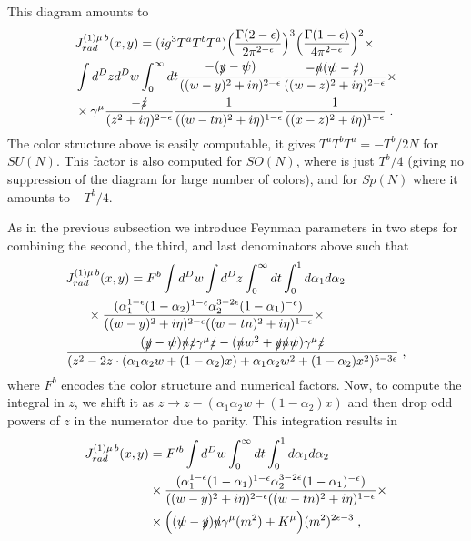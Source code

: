 \documentclass[%
 reprint,
 amsmath,amssymb,
 aps,
]{revtex4-1}
\begin{document}
This diagram amounts to
\begin{align}
&J^{(1)\mu\,b}_{rad}(x,y)=(ig^3T^aT^bT^a)\Big(\frac{\Gamma(2-\epsilon)}{2\pi^{2-\epsilon}}\Big)^3\Big(\frac{\Gamma(1-\epsilon)}{4\pi^{2-\epsilon}}\Big)^2\times\nonumber\\
&\int d^Dzd^Dw \int_0^\infty d t \frac{-(\slashed y-\slashed w)}{((w-y)^2+i\eta)^{2-\epsilon}} \frac{-\slashed n(\slashed w-\slashed z)}{((w-z)^2+i\eta)^{2-\epsilon}}\times\nonumber\\
&\times \gamma^\mu\frac{-\slashed z}{(z^2+i\eta)^{2-\epsilon}}\frac{1}{((w-tn)^2+i\eta)^{1-\epsilon}}\frac{1}{((x-z)^2+i\eta)^{1-\epsilon}}\;.
\end{align}
The color structure above is easily computable, it gives $T^aT^bT^a=-T^b/2N$ for $SU(N)$. This factor is also computed for $SO(N)$, where is just $T^b/4$ (giving no suppression of the diagram for large number of colors), and for $Sp(N)$ where it amounts to $-T^b/4$.\par
As in the previous subsection we introduce Feynman parameters in two steps for combining the second, the third, and last denominators above such that
\begin{align}
&J^{(1)\mu\,b}_{rad}(x,y)=F^b\int d^Dw\int d^Dz\int_0^\infty dt \int_0^1d\alpha_1d\alpha_2\\
&\;\;\;\;\;\;\times\frac{(\alpha_1^{1-\epsilon}(1-\alpha_2)^{1-\epsilon}\alpha_2^{3-2\epsilon}(1-\alpha_1)^{-\epsilon})}{((w-y)^2+i\eta)^{2-\epsilon}((w-tn)^2+i\eta)^{1-\epsilon}}\times\nonumber\\
&\frac{(\slashed y-\slashed w)\slashed n \slashed z\gamma^\mu \slashed z-(\slashed n w^2+\slashed y \slashed n \slashed w)\gamma^\mu \slashed z}{(z^2-2z\cdot (\alpha_1\alpha_2 w+(1-\alpha_2)x)+\alpha_1\alpha_2 w^2+(1-\alpha_2)x^2)^{5-3\epsilon}}\;,
\end{align}
where $F^b$ encodes the color structure and numerical factors. Now, to compute the integral in $z$, we shift it as $z\to z-(\alpha_1\alpha_2 w+(1-\alpha_2)x)$ and then drop odd powers of $z$ in the numerator due to parity. This integration results in
\begin{align}
J^{(1)\mu\,b}_{rad}(x,y)&=F'^b\int d^Dw\int_0^\infty dt \int_0^1d\alpha_1d\alpha_2\nonumber\\
&\times\frac{(\alpha_1^{1-\epsilon}(1-\alpha_1)^{1-\epsilon}\alpha_2^{3-2\epsilon}(1-\alpha_1)^{-\epsilon})}{((w-y)^2+i\eta)^{2-\epsilon}((w-tn)^2+i\eta)^{1-\epsilon}}\times\nonumber\\
&\times \Big((\slashed w-\slashed y)\slashed n \gamma^\mu (m^2)+K^\mu\Big)(m^2)^{2\epsilon-3}\;,
\end{align}
\end{document}
